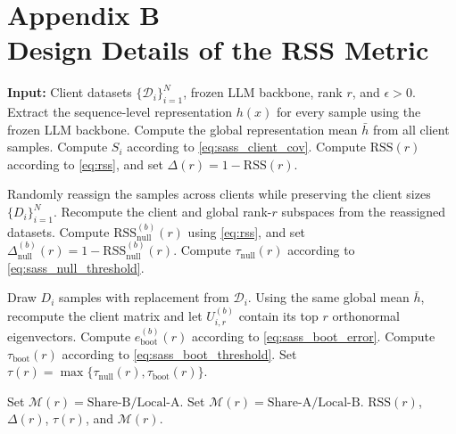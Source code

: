 \documentclass[lettersize,journal]{IEEEtran}
\begin{document}
	
	\section*{Appendix B \\ Design Details of the RSS Metric}
	\label{app:cls_sass_details}
	
	
	\begin{algorithm}[t]
		\caption{RSS Computation Workflow}
		\label{alg:rss_workflow}
		\begin{algorithmic}[1]
			\STATE \textbf{Input:} Client datasets
			$\{\mathcal{D}_i\}_{i=1}^{N}$, frozen LLM backbone,
			rank $r$, and $\epsilon>0$.
			\STATE Extract the sequence-level representation $h(x)$ for every sample using the frozen LLM backbone.
			\STATE Compute the global representation mean $\bar{h}$ from all client samples.
			\STATE Compute $S_i$ according to
			\eqref{eq:sass_client_cov}.
			\ENDFOR
			\STATE Compute $\mathrm{RSS}(r)$ according to
			\eqref{eq:rss}, and set
			$\Delta(r)=1-\mathrm{RSS}(r)$.
			
			\STATE Randomly reassign the samples across clients while preserving the client sizes $\{D_i\}_{i=1}^{N}$.
			\STATE Recompute the client and global rank-$r$ subspaces from the reassigned datasets.
			\STATE Compute
			$\mathrm{RSS}_{\mathrm{null}}^{(b)}(r)$ using
			\eqref{eq:rss}, and set
			$\Delta_{\mathrm{null}}^{(b)}(r)
			=1-\mathrm{RSS}_{\mathrm{null}}^{(b)}(r)$.
			\ENDFOR
			\STATE Compute $\tau_{\mathrm{null}}(r)$ according to
			\eqref{eq:sass_null_threshold}.
			
			\STATE Draw $D_i$ samples with replacement from $\mathcal{D}_i$.
			\STATE Using the same global mean $\bar{h}$, recompute the client matrix and let $U_{i,r}^{(b)}$ contain its top $r$ orthonormal eigenvectors.
			\ENDFOR
			\STATE Compute $e_{\mathrm{boot}}^{(b)}(r)$ according to
			\eqref{eq:sass_boot_error}.
			\ENDFOR
			\STATE Compute $\tau_{\mathrm{boot}}(r)$ according to
			\eqref{eq:sass_boot_threshold}.
			\STATE Set
			$\tau(r)=
			\max\{\tau_{\mathrm{null}}(r),
			\tau_{\mathrm{boot}}(r)\}$.
			
			\STATE Set
			$\mathcal{M}(r)=\text{Share-B/Local-A}$.
			\ELSE
			\STATE Set
			$\mathcal{M}(r)=\text{Share-A/Local-B}$.
			\ENDIF
			\RETURN $\mathrm{RSS}(r)$, $\Delta(r)$,
			$\tau(r)$, and $\mathcal{M}(r)$.
		\end{algorithmic}
	\end{algorithm}
	
\end{document}
